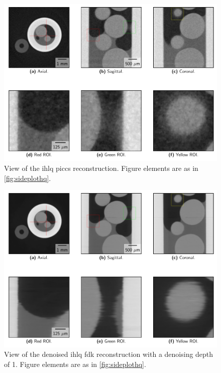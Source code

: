 \begin{figure}[htbp]
  \centering
  \includegraphics[width=.9\textwidth]{figures/kimrobertpiccs-x475y620s250.pdf}
  \caption[View of IHLQ PICCS]{View of the \acrshort{ihlq} \acrshort{piccs} reconstruction. Figure elements are as in \cref{fig:sideplothq}. }
  \label{fig:sideplotpiccs}
\end{figure}

\begin{figure}[htbp]
  \centering
  \includegraphics[width=.9\textwidth]{figures/kimrobertdepth1-x475y620s250.pdf}
  \caption[View of IHLQ FDK denoised with a depth of 1]{View of the denoised \acrshort{ihlq} \acrshort{fdk} reconstruction with a denoising depth of 1. Figure elements are as in \cref{fig:sideplothq}. }
  \label{fig:sideplotdepth1}
\end{figure}

